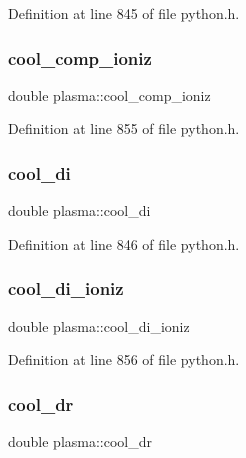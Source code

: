 Definition at line 845 of file python.\+h.

\mbox{\label{structplasma_a90c93c3a8fb77ca113fa5837491fe967}} 
\subsubsection{\texorpdfstring{cool\+\_\+comp\+\_\+ioniz}{cool\_comp\_ioniz}}
{\footnotesize\ttfamily double plasma\+::cool\+\_\+comp\+\_\+ioniz}



Definition at line 855 of file python.\+h.

\mbox{\label{structplasma_a5505637faee8b3d92778c1948e8b0e35}} 
\subsubsection{\texorpdfstring{cool\+\_\+di}{cool\_di}}
{\footnotesize\ttfamily double plasma\+::cool\+\_\+di}



Definition at line 846 of file python.\+h.

\mbox{\label{structplasma_ae7cfeaf05f9b888e57e0dd66b1d393bc}} 
\subsubsection{\texorpdfstring{cool\+\_\+di\+\_\+ioniz}{cool\_di\_ioniz}}
{\footnotesize\ttfamily double plasma\+::cool\+\_\+di\+\_\+ioniz}



Definition at line 856 of file python.\+h.

\mbox{\label{structplasma_a2e449de44ae3c3c3b7fec875b2e55e72}} 
\subsubsection{\texorpdfstring{cool\+\_\+dr}{cool\_dr}}
{\footnotesize\ttfamily double plasma\+::cool\+\_\+dr}



